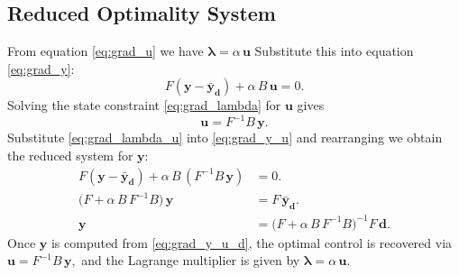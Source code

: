 \documentclass[a4paper,10pt]{article}
\begin{document}
\subsection*{Reduced Optimality System}
From equation \eqref{eq:grad_u} we have
\(\symbf{\lambda} = \alpha\,\mathbf{u}\)
Substitute this into equation \eqref{eq:grad_y}:
\[
	F(\mathbf{y}-\mathbf{\bar{y}_d}) + \alpha\,B\,\mathbf{u} = 0. \tag{4} \label{eq:grad_y_u}
\]
Solving the state constraint \eqref{eq:grad_lambda} for \(\mathbf{u}\) gives
\[
	\mathbf{u} = F^{-1}B\,\mathbf{y}. \tag{5} \label{eq:grad_lambda_u}
\]
Substitute \eqref{eq:grad_lambda_u} into \eqref{eq:grad_y_u} and rearranging we obtain the reduced system for \(\mathbf{y}\):
\begin{align*}
	F(\mathbf{y}-\mathbf{\bar{y}_d}) + \alpha\,B\,(F^{-1}B\,\mathbf{y}) & = 0.                                                                                  \\
	\bigl(F + \alpha\,B\,F^{-1}B\bigr)\,\mathbf{y}              & = F\,\mathbf{\bar{y}_d}.                                                                      \\
	\mathbf{y}                                                  & = \bigl(F + \alpha\,B\,F^{-1}B\bigr)^{-1}F\,\mathbf{d}. \tag{6} \label{eq:grad_y_u_d}
\end{align*}
Once \(\mathbf{y}\) is computed from \eqref{eq:grad_y_u_d}, the optimal control is recovered via \(\mathbf{u} = F^{-1}B\,\mathbf{y},\)
and the Lagrange multiplier is given by \(\symbf{\lambda} = \alpha\,\mathbf{u}\).
\end{document}
